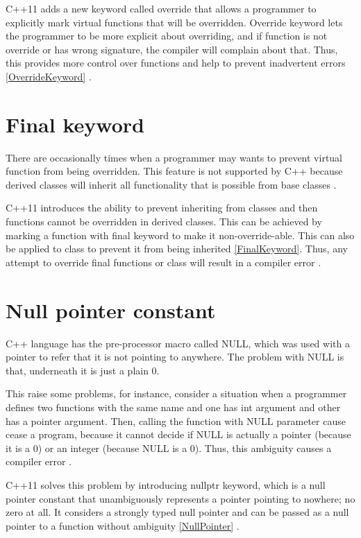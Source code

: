\documentclass[11pt]{report}
\begin{document}
C++11 adds a new keyword called override that allows a programmer to explicitly mark virtual functions that will be overridden. Override keyword lets the programmer to be more explicit about overriding, and if function is not override or has wrong signature, the compiler will complain about that. Thus, this provides more control over functions and help to prevent inadvertent errors \ref{OverrideKeyword} \cite{Gregorie:professionalcpp}.

\section{Final keyword}
\label{section: Final keyword}
There are occasionally times when a programmer may wants to prevent virtual function from being overridden. This feature is not supported by C++ because derived classes will inherit all functionality that is possible from base classes \cite{Stroustrup:2012:Cpp11}.


C++11 introduces the ability to prevent inheriting from classes and then functions cannot be overridden in derived classes. This can be achieved by marking a function with final keyword to make it non-override-able. This can also be applied to class to prevent it from being inherited \ref{FinalKeyword}.  Thus, any attempt to override final functions or class will result in a compiler error  \cite{Gregorie:professionalcpp}.

\section{Null pointer constant}
\label{section: Null pointer constant}
C++ language has the pre-processor macro called NULL, which was used with a pointer to refer that it is not pointing to anywhere. The problem with NULL is that, underneath it is just a plain 0. 


This raise some problems, for instance, consider a situation when a programmer defines two functions with the same name and one has int argument and other has a pointer argument. Then, calling the function with NULL parameter cause cease a program, because it cannot decide if NULL is actually a pointer (because it is a 0) or an integer (because NULL is a 0). Thus, this ambiguity causes a compiler error \cite{Cppreference:2012:Cpp11}.


C++11 solves this problem by introducing nullptr keyword, which is a null pointer constant that unambiguously represents a pointer pointing to nowhere; no zero at all. It considers a strongly typed null pointer and can be passed as a null pointer to a function without ambiguity \ref{NullPointer} \cite{Cppreference:2012:Cpp11}. 
\end{document}

